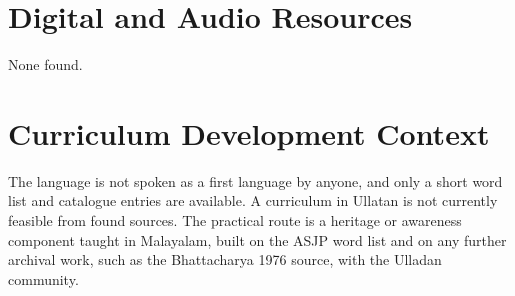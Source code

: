 \documentclass[12pt]{article}
\begin{document}
\section{Digital and Audio Resources}
None found.

\section{Curriculum Development Context}
The language is not spoken as a first language by anyone, and only a short word list and catalogue entries are available. A curriculum in Ullatan is not currently feasible from found sources. The practical route is a heritage or awareness component taught in Malayalam, built on the ASJP word list and on any further archival work, such as the Bhattacharya 1976 source, with the Ulladan community.
\end{document}
